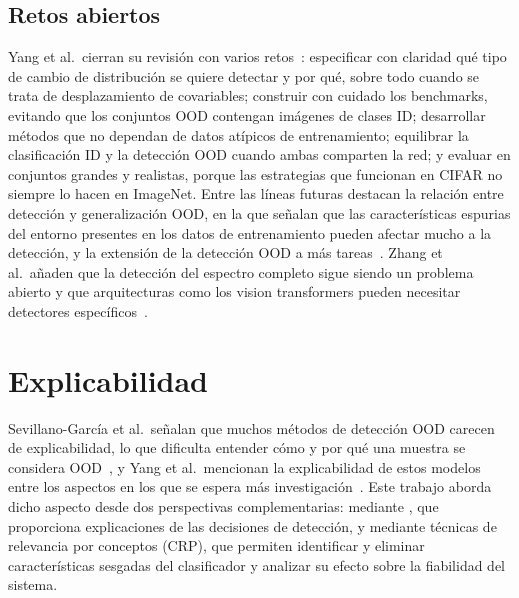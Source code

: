 \subsection{Retos abiertos}\label{sec:ea-retos}

Yang et al.\ cierran su revisión con varios retos~\cite{yang2024}: especificar
con claridad qué tipo de cambio de distribución se quiere detectar y por qué,
sobre todo cuando se trata de desplazamiento de covariables; construir con
cuidado los benchmarks, evitando que los conjuntos OOD contengan imágenes de
clases ID; desarrollar métodos que no dependan de datos atípicos de
entrenamiento; equilibrar la clasificación ID y la detección OOD cuando ambas
comparten la red; y evaluar en conjuntos grandes y realistas, porque las
estrategias que funcionan en CIFAR no siempre lo hacen en ImageNet. Entre las
líneas futuras destacan la relación entre detección y generalización OOD, en la
que señalan que las características espurias del entorno presentes en los datos de
entrenamiento pueden afectar mucho a la detección, y la extensión de la detección
OOD a más tareas~\cite{yang2024}. Zhang et al.\ añaden que la detección del
espectro completo sigue siendo un problema abierto y que arquitecturas como los
vision transformers pueden necesitar detectores
específicos~\cite{openood15}.

\section{Explicabilidad}\label{sec:ea-explicabilidad}

Sevillano-García et al.\ señalan que muchos métodos de detección OOD carecen de
explicabilidad, lo que dificulta entender cómo y por qué una muestra se considera
OOD~\cite{sevillano2026}, y Yang et al.\ mencionan la explicabilidad de estos
modelos entre los aspectos en los que se espera más
investigación~\cite{yang2024}. Este trabajo aborda dicho aspecto desde dos
perspectivas complementarias: mediante \stoodx, que proporciona explicaciones de
las decisiones de detección, y mediante técnicas de relevancia por conceptos
(CRP), que permiten identificar y eliminar características sesgadas del
clasificador y analizar su efecto sobre la fiabilidad del sistema.

